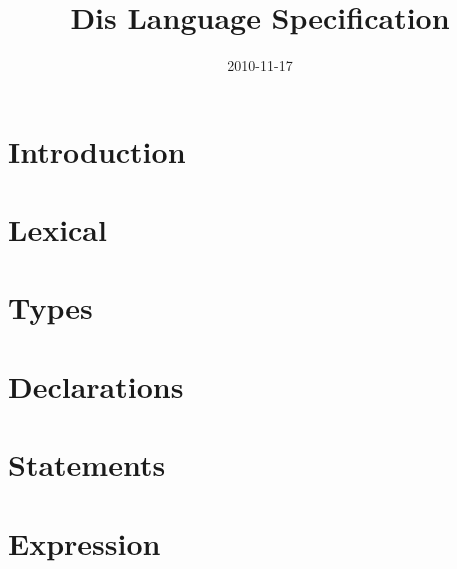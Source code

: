 \documentclass{scrartcl}
\title{Dis Language Specification}
\date{2010-11-17}
\begin{document}
\section*{Introduction}

\section*{Lexical}

\section*{Types}

\section*{Declarations}

\section*{Statements}

\section*{Expression}
\end{document}
